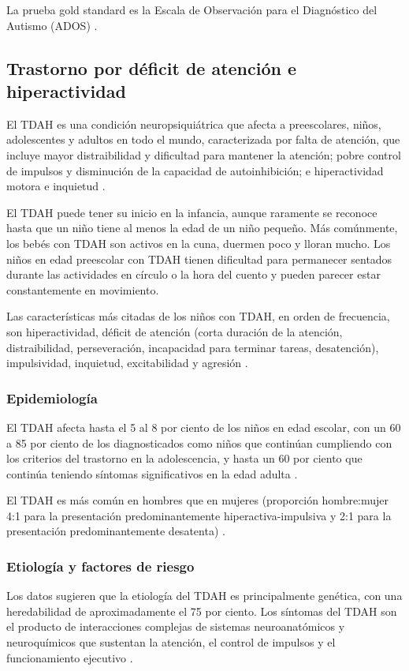 La prueba gold standard es la Escala de Observación para el Diagnóstico del
Autismo (ADOS) \cite{Koth2023}.

\subsection{Trastorno por déficit de atención e hiperactividad}
El TDAH es una condición neuropsiquiátrica que afecta a preescolares, niños,
adolescentes y adultos en todo el mundo, caracterizada por falta de atención,
que incluye mayor distraibilidad y dificultad para mantener la atención;
pobre control de impulsos y disminución de la capacidad de autoinhibición; e
hiperactividad motora e inquietud \cite{Boland2021-by, Nelson50}.

El TDAH puede tener su inicio en la infancia, aunque raramente se reconoce
hasta que un niño tiene al menos la edad de un niño pequeño. Más comúnmente,
los bebés con TDAH son activos en la cuna, duermen poco y lloran mucho. Los
niños en edad preescolar con TDAH tienen dificultad para permanecer sentados
durante las actividades en círculo o la hora del cuento y pueden parecer estar
constantemente en movimiento.

Las características más citadas de los niños con TDAH, en orden de frecuencia,
son hiperactividad, déficit de atención (corta duración de la atención,
distraibilidad, perseveración, incapacidad para terminar tareas, desatención),
impulsividad, inquietud, excitabilidad y agresión \cite{Boland2021-by}.

\subsubsection{Epidemiología}
El TDAH afecta hasta el 5 al 8 por ciento de los niños en edad escolar, con un
60 a 85 por ciento de los diagnosticados como niños que continúan cumpliendo
con los criterios del trastorno en la adolescencia, y hasta un 60 por ciento
que continúa teniendo síntomas significativos en la edad adulta
\cite{Boland2021-by}.

El TDAH es más común en hombres que en mujeres (proporción hombre:mujer 4:1
para la presentación predominantemente hiperactiva-impulsiva y 2:1 para la
presentación predominantemente desatenta) \cite{ADHDUpToDate}.

\subsubsection{Etiología y factores de riesgo}
Los datos sugieren que la etiología del TDAH es principalmente genética, con
una heredabilidad de aproximadamente el 75 por ciento. Los síntomas del TDAH
son el producto de interacciones complejas de sistemas neuroanatómicos y
neuroquímicos que sustentan la atención, el control de impulsos y el
funcionamiento ejecutivo \cite{Boland2021-by}.

